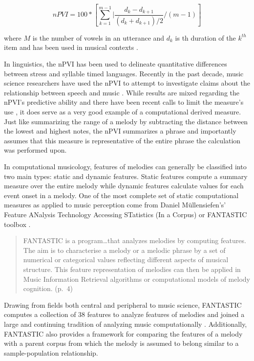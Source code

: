 \documentclass[12pt,]{book}
\begin{document}
\[nPVI = 100 * [\sum_{k=1}^{m-1} | \frac{d_k - d_{k+1}}{(d_k + d_{k+1})/2}/(m-1)] \]

where \(M\) is the number of vowels in an utterance and \(d_k\) is th duration of the \(k^{th}\) item and has been used in musical contexts \citep{vanhandelRoleMeterCompositional2010}.

In linguistics, the nPVI has been used to delineate quantitative differences between stress and syllable timed languages.
Recently in the past decade, music science researchers have used the nPVI to attempt to investigate claims about the relationship between speech and music \citep{danieleInterplayLinguisitcHistorical2004, patelStressTimedVsSyllableTimed2003, vanhandelRoleMeterCompositional2010}.
While results are mixed regarding the nPVI's predictive ability and there have been recent calls to limit the measure's use \citep{condit-schultzDeconstructingNPVIMethodological2019}, it does serve as a very good example of a computational derived measure.
Just like summarizing the range of a melody by subtracting the distance between the lowest and highest notes, the nPVI summarizes a phrase and importantly assumes that this measure is representative of the entire phrase the calculation was performed upon.

In computational musicology, features of melodies can generally be classified into two main types: static and dynamic features.
Static features compute a summary measure over the entire melody while dynamic features calculate values for each event onset in a melody.
One of the most complete set of static computational measures as applied to music perception come from Daniel Müllensiefen's' Feature ANalysis Technology Accessing STatistics (In a Corpus) or FANTASTIC toolbox \citep{mullensiefenFantasticFeatureANalysis2009}.

\begin{quote}
FANTASTIC is a program\ldots{}that analyzes melodies by computing features. The aim is to characterise a melody or a melodic phrase by a set of numerical or categorical values reflecting different aspects of musical structure. This feature representation of melodies can then be applied in Music Information Retrieval algorithms or computational models of melody cognition. (p.~4)
\end{quote}

Drawing from fields both central and peripheral to music science, FANTASTIC computes a collection of 38 features to analyze features of melodies and joined a large and continuing tradition of analyzing music computationally \citetext{\citealp[ ]{lomaxCantometricsApproachAnthropology1977}; \citealp{eerolaExpectancySamiYoiks2009}; \citealp{huronHumdrumToolkitReference1994}; \citealp{lartillotMatlabToolboxMusical2007}; \citealp{lomaxCantometricsApproachAnthropology1977}; \citealp{mcfeeLibrosaAudioMusic2015}; \citealp{steinbeckStrukturUndAhnlichkeit1982}}.
Additionally, FANTASTIC also provides a framework for comparing the features of a melody with a parent corpus from which the melody is assumed to belong similar to a sample-population relationship.
\end{document}
